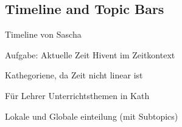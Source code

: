 \subsection{Timeline and Topic Bars}
Timeline von Sascha

Aufgabe: Aktuelle Zeit Hivent im Zeitkontext

Kathegoriene, da Zeit nicht linear ist

Für Lehrer Unterrichtsthemen in Kath

Lokale und Globale einteilung (mit Subtopics)
